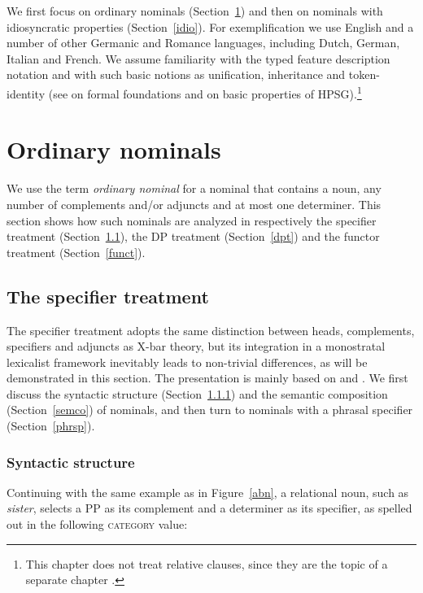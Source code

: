 \documentclass[output=paper
                ,modfonts
                ,nonflat
	        ,collection
	        ,collectionchapter
	        ,collectiontoclongg
 	        ,biblatex
                ,babelshorthands
                ,newtxmath
                ,draftmode
                ,colorlinks, citecolor=brown
]{./langsci/langscibook}
\begin{document}
We first focus on ordinary nominals (Section~\ref{ordi}) and then on nominals with idiosyncratic 
properties (Section~\ref{idio}). For exemplification we use English and a number of other Germanic 
and Romance languages, including Dutch, German, Italian and French.  
We assume familiarity with the typed feature description notation and with such basic notions 
as unification, inheritance and token-identity (see  on formal
foundations and  on basic properties of HPSG).\footnote{This chapter does not treat relative clauses,
since they are the topic of a separate chapter .}
    
\section{Ordinary nominals} 
\label{ordi} 

We use the term \emph{ordinary nominal} for a nominal that contains a noun, 
any number of complements and/or adjuncts and at most one determiner. 
This section shows how such nominals are analyzed in respectively the 
specifier treatment (Section~\ref{spect}), the DP treatment (Section~\ref{dpt}) and 
the functor treatment (Section~\ref{funct}). 

    
\subsection{The specifier treatment} 
\label{spect} 


The specifier treatment adopts the same distinction between heads, complements, 
specifiers and adjuncts as X-bar theory, but its integration 
in a monostratal lexicalist framework inevitably leads to non-trivial differences,
as will be demonstrated in this section. 
The presentation is mainly based on \citet{ps2} and \citet{GS00}. 
We first discuss the syntactic structure (Section~\ref{syns}) and the semantic composition (Section~\ref{semco}) 
of nominals, and then turn to nominals with a phrasal specifier (Section~\ref{phrsp}). 


\subsubsection{Syntactic structure}
\label{syns} 

Continuing with the same example as in Figure~\ref{abn}, 
a relational noun, such as \emph{sister}, selects a PP as its complement 
and a determiner as its specifier, as spelled out in 
the following \textsc{category} value:  
\end{document}
